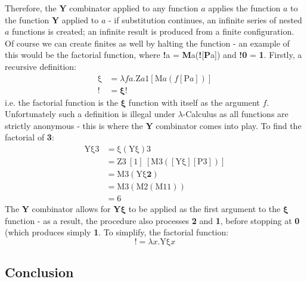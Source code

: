 \documentclass[Master.tex]{subfiles}
\begin{document}
Therefore, the \textbf{Y} combinator applied to any function $a$ applies the function $a$ to the function \textbf{Y} applied to $a$ - if substitution continues, an infinite series of nested $a$ functions is created; an infinite result is produced from a finite configuration. Of course we can create finites as well by halting the function - an example of this would be the factorial function, where \textbf{!}a = \textbf{M}a(\textbf{!}[\textbf{P}a]) and \textbf{!0} = \textbf{1}. Firstly, a recursive definition:
\begin{equation*}
\begin{aligned}
\bm{\mathrm{\xi}} &= \lambda fa.\bm{\mathrm{Z}}a\bm{\mathrm{1}}[\bm{\mathrm{M}}a(f[\bm{\mathrm{P}}a])]\\
\bm{!} &= \bm{\xi}!
\end{aligned}
\end{equation*}
i.e. the factorial function is the $\bm{\xi}$ function with itself as the argument $f$. Unfortunately such a definition is illegal under $\lambda$-Calculus as all functions are strictly anonymous - this is where the \textbf{Y} combinator comes into play. To find the factorial of \textbf{3}:
\begin{equation*}
\begin{aligned}
\bm{\mathrm{Y\xi 3}} &= \bm{\mathrm{\xi}}(\bm{\mathrm{Y\xi}})\bm{\mathrm{3}}\\
&= \bm{\mathrm{Z3}}\ [\bm{\mathrm{1}}]\ [\bm{\mathrm{M3}}([\bm{\mathrm{Y\xi}}][\bm{\mathrm{P3}}])]\\
&= \bm{\mathrm{M3}}(\bm{\mathrm{Y\xi}}\bm{2})\\
&= \bm{\mathrm{M3}}(\bm{\mathrm{M2}}(\bm{\mathrm{M11}}))\\
&= \bm{\mathrm{6}}
\end{aligned}
\end{equation*}
The \textbf{Y} combinator allows for \textbf{Y}$\bm{\xi}$ to be applied as the first argument to the $\bm{\xi}$ function - as a result, the procedure also processes \textbf{2} and \textbf{1}, before stopping at \textbf{0} (which produces simply \textbf{1}. To simplify, the factorial function:
\begin{equation*}
\bm{!} = \lambda x.\bm{\mathrm{Y\xi}}x
\end{equation*}
\subsection{Conclusion}
\end{document}
